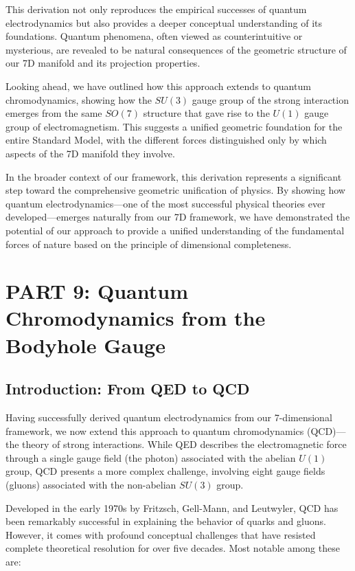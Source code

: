 \documentclass{article}
\begin{document}
This derivation not only reproduces the empirical successes of quantum electrodynamics but also provides a deeper conceptual understanding of its foundations. Quantum phenomena, often viewed as counterintuitive or mysterious, are revealed to be natural consequences of the geometric structure of our 7D manifold and its projection properties.

Looking ahead, we have outlined how this approach extends to quantum chromodynamics, showing how the $SU(3)$ gauge group of the strong interaction emerges from the same $SO(7)$ structure that gave rise to the $U(1)$ gauge group of electromagnetism. This suggests a unified geometric foundation for the entire Standard Model, with the different forces distinguished only by which aspects of the 7D manifold they involve.

In the broader context of our framework, this derivation represents a significant step toward the comprehensive geometric unification of physics. By showing how quantum electrodynamics—one of the most successful physical theories ever developed—emerges naturally from our 7D framework, we have demonstrated the potential of our approach to provide a unified understanding of the fundamental forces of nature based on the principle of dimensional completeness.






\section{PART 9: Quantum Chromodynamics from the Bodyhole Gauge}

\subsection{Introduction: From QED to QCD}

Having successfully derived quantum electrodynamics from our 7-dimensional framework, we now extend this approach to quantum chromodynamics (QCD)—the theory of strong interactions. While QED describes the electromagnetic force through a single gauge field (the photon) associated with the abelian $U(1)$ group, QCD presents a more complex challenge, involving eight gauge fields (gluons) associated with the non-abelian $SU(3)$ group.

Developed in the early 1970s by Fritzsch, Gell-Mann, and Leutwyler, QCD has been remarkably successful in explaining the behavior of quarks and gluons. However, it comes with profound conceptual challenges that have resisted complete theoretical resolution for over five decades. Most notable among these are:
\end{document}
